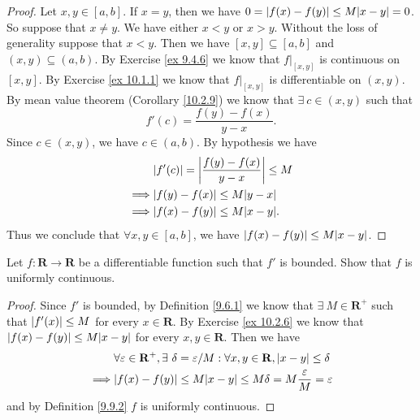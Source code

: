 \begin{proof}
    Let \(x, y \in [a, b]\).
    If \(x = y\), then we have \(0 = \abs*{f(x) - f(y)} \leq M \abs*{x - y} = 0\).
    So suppose that \(x \neq y\).
    We have either \(x < y\) or \(x > y\).
    Without the loss of generality suppose that \(x < y\).
    Then we have \([x, y] \subseteq [a, b]\) and \((x, y) \subseteq (a, b)\).
    By Exercise \ref{ex 9.4.6} we know that \(f|_{[x, y]}\) is continuous on \([x, y]\).
    By Exercise \ref{ex 10.1.1} we know that \(f|_{[x, y]}\) is differentiable on \((x, y)\).
    By mean value theorem (Corollary \ref{10.2.9}) we know that \(\exists\ c \in (x, y)\) such that
    \[
        f'(c) = \frac{f(y) - f(x)}{y - x}.
    \]
    Since \(c \in (x, y)\), we have \(c \in (a, b)\).
    By hypothesis we have
    \begin{align*}
                 & \abs*{f'(c)} = \abs*{\frac{f(y) - f(x)}{y - x}} \leq M \\
        \implies & \abs*{f(y) - f(x)} \leq M \abs*{y - x}                 \\
        \implies & \abs*{f(x) - f(y)} \leq M \abs*{x - y}.
    \end{align*}
    Thus we conclude that \(\forall x, y \in [a, b]\), we have \(\abs*{f(x) - f(y)} \leq M \abs*{x - y}\).
\end{proof}

\begin{exercise}\label{ex 10.2.7}
    Let \(f : \mathbf{R} \to \mathbf{R}\) be a differentiable function such that \(f'\) is bounded.
    Show that \(f\) is uniformly continuous.
\end{exercise}

\begin{proof}
    Since \(f'\) is bounded, by Definition \ref{9.6.1} we know that \(\exists\ M \in \mathbf{R}^+\) such that \(\abs*{f'(x)} \leq M\) for every \(x \in \mathbf{R}\).
    By Exercise \ref{ex 10.2.6} we know that \(\abs*{f(x) - f(y)} \leq M \abs*{x - y}\) for every \(x, y \in \mathbf{R}\).
    Then we have
    \begin{align*}
                 & \forall \varepsilon \in \mathbf{R}^+, \exists\ \delta = \varepsilon / M : \forall x, y \in \mathbf{R}, \abs*{x - y} \leq \delta \\
        \implies & \abs*{f(x) - f(y)} \leq M \abs*{x - y} \leq M \delta = M \frac{\varepsilon}{M} = \varepsilon
    \end{align*}
    and by Definition \ref{9.9.2} \(f\) is uniformly continuous.
\end{proof}